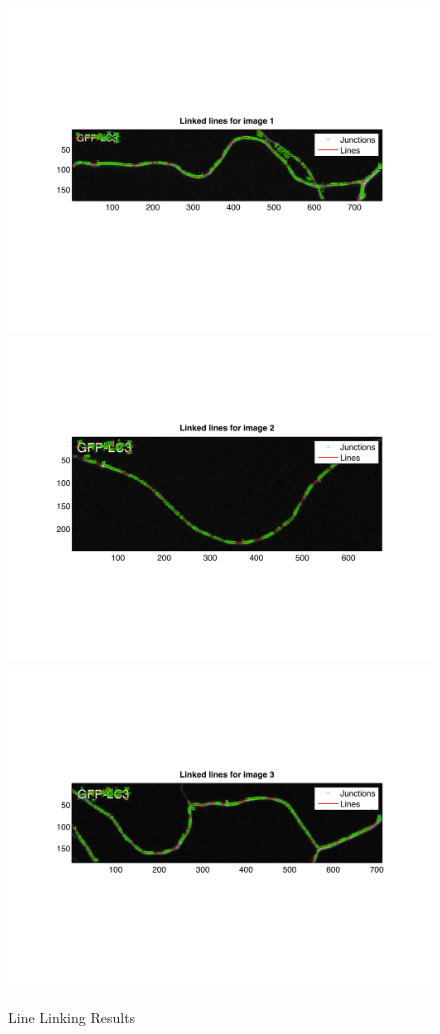\documentclass{article}
\begin{document}
\begin{figure}[h]
\centering
\includegraphics[width=\textwidth]{figures/line_linking_1.pdf}
\includegraphics[width=\textwidth]{figures/line_linking_2.pdf}
\includegraphics[width=\textwidth]{figures/line_linking_3.pdf}
\caption{Line Linking Results}
\label{fig:line_linking}
\end{figure}
\end{document}
